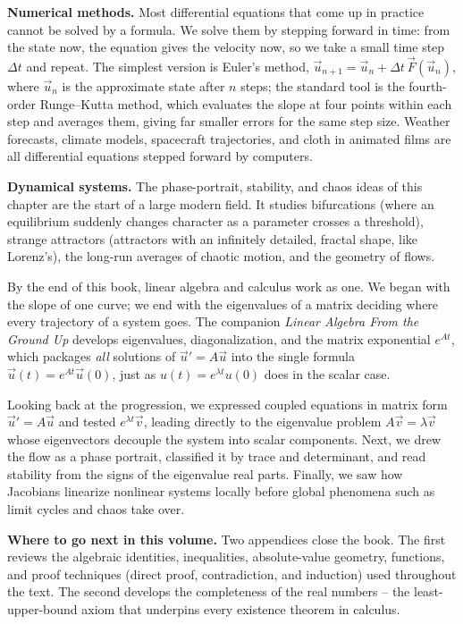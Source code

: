 \textbf{Numerical methods.} Most differential equations that come up in practice
cannot be solved by a formula. We solve them by stepping forward in time: from the state now,
the equation gives the velocity now, so we take a small time step $\Delta t$ and
repeat. The simplest version is Euler's method,
$\vec u_{n+1} = \vec u_n + \Delta t\,\vec F(\vec u_n)$, where $\vec u_n$ is the
approximate state after $n$ steps; the standard tool is the
fourth-order Runge--Kutta method, which evaluates the slope at four points within each step
and averages them, giving far smaller errors for the same step size. Weather forecasts, climate models, spacecraft trajectories, and
cloth in animated films are all differential equations stepped forward by
computers.

\textbf{Dynamical systems.} The phase-portrait, stability, and chaos ideas of
this chapter are the start of a large modern field. It studies
bifurcations (where an
equilibrium suddenly changes character as a parameter crosses a threshold),
strange attractors (attractors with an infinitely detailed, fractal shape, like
Lorenz's), the long-run averages of chaotic motion, and the geometry of flows.

\begin{connectionbox}
By the end of this book, linear algebra and calculus work as one.
We began with the slope of one curve; we end with the eigenvalues of a
matrix deciding where every trajectory of a system goes. The companion
\emph{Linear Algebra From the Ground Up} develops eigenvalues, diagonalization,
and the matrix exponential
$e^{At}$, which packages \emph{all} solutions of $\vec u'=A\vec u$ into the
single formula $\vec u(t) = e^{At}\vec u(0)$, just as $u(t)=e^{\lambda t}u(0)$
does in the scalar case.
\end{connectionbox}

\begin{recoverybox}
Looking back at the progression, we expressed coupled equations in matrix form $\vec u' = A\vec u$ and tested $e^{\lambda t}\vec v$, leading directly to the eigenvalue problem $A\vec v = \lambda \vec v$ whose eigenvectors decouple the system into scalar components. Next, we drew the flow as a phase portrait, classified it by trace and determinant, and read stability from the signs of the eigenvalue real parts. Finally, we saw how Jacobians linearize nonlinear systems locally before global phenomena such as limit cycles and chaos take over.
\end{recoverybox}

\textbf{Where to go next in this volume.}
Two appendices close the book. The first reviews the algebraic identities, inequalities, absolute-value geometry, functions, and proof techniques (direct proof, contradiction, and induction) used throughout the text. The second develops the completeness of the real numbers -- the least-upper-bound axiom that underpins every existence theorem in calculus.


